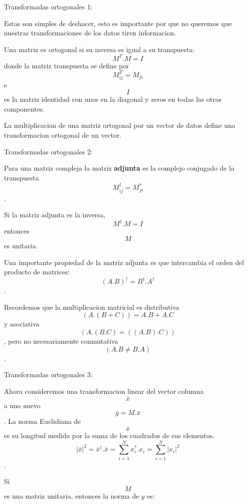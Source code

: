 \documentclass[ignorenonframetext,]{beamer}
\begin{document}
\begin{frame}

\begin{block}{Transformadas ortogonales 1:}

Estas son simples de deshacer, esto es importante por que no queremos
que nuestras transformaciones de los datos tiren informacion.

Una matriz es ortogonal si su inversa es igual a su transpuesta:
\[M^T . M = I\] donde la matriz transpuesta se define por
\[M_{ij}^{T} = M_{ji}\] e \[I\] es la matriz identidad con unos en la
diagonal y zeros en todas las otras componentes.

La multiplicacion de una matriz ortogonal por un vector de datos define
una transformacion ortogonal de un vector.

\end{block}

\end{frame}

\begin{frame}

\begin{block}{Transformadas ortogonales 2:}

Para una matriz compleja la matriz \textbf{adjunta} es la complejo
conjugado de la transpuesta \[M_{ij}^{\dagger} = M_{ji}^{*}\].

Si la matriz adjunta es la inversa, \[M^{\dagger}.M=I\] entonces \[M\]
es unitaria.

Una importante propiedad de la matriz adjunta es que intercambia el
orden del producto de matrices:
\[(A.B)^{\dagger}=B^{\dagger}.A^{\dagger}\].

Recordemos que la multiplicacion matricial es distributiva
\[(A.(B+C))=A.B+A.C\] y asociativa \[(A.(B.C)=((A.B).C))\], pero no
necesariamente conmutativa \[(A.B \neq B.A)\].

\end{block}

\end{frame}

\begin{frame}

\begin{block}{Transformadas ortogonales 3:}

Ahora consideremos una transformacion linear del vector columna
\[\bar{x}\] a uno nuevo \[\bar{y} = M. \bar{x}\]. La norma Euclidiana de
\[\bar{x}\] es su longitud medida por la suma de los cuadrados de sus
elementos.
\[|\bar{x}|^{2}=\bar{x}^{\dagger}.\bar{x}=\sum_{i=1}^{N} x_{i}^{*}.x_{i}=\sum_{i=1}^{N}|x_{i}|^{2}\].

Si \[M\] es una matriz unitaria, entonces la norma de \(y\) es:

\end{block}

\end{frame}
\end{document}
